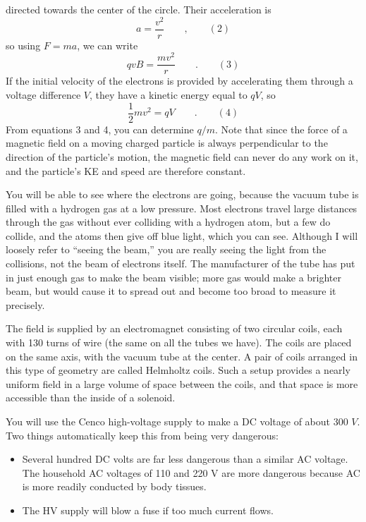 directed towards the center of the circle. Their acceleration is
\begin{equation*}
      a  =  \frac{v^2}{r}  \qquad ,  \qquad  (2)  
\end{equation*}
so using $F=ma$, we can write
\begin{equation*}
      qvB  =  \frac{mv^2}{r} \qquad .  \qquad  (3)  
\end{equation*}
If the initial velocity of the electrons is provided by
accelerating them through a voltage difference $V$, they
have a kinetic energy equal to $qV$, so
\begin{equation*}
   \frac{1}{2}mv^2 = qV \qquad . \qquad   (4)
\end{equation*}
From equations 3 and 4, you can determine $q/m$. Note that
since the force of a magnetic field on a moving charged
particle is always perpendicular to the direction of the
particle's motion, the magnetic field can never do any work
on it, and the particle's KE and speed are therefore constant.

You will be able to see where the electrons are going,
because the vacuum tube is filled with a hydrogen gas at a
low pressure. Most electrons travel large distances through
the gas without ever colliding with a hydrogen atom, but a
few do collide, and the atoms then give off blue light,
which you can see. Although I will loosely refer to ``seeing
the beam,'' you are really seeing the light from the
collisions, not the beam of electrons itself. The manufacturer
of the tube has put in just enough gas to make the beam
visible; more gas would make a brighter beam, but would
cause it to spread out and become too broad to measure it precisely.

The field is supplied by an electromagnet consisting of two
circular coils, each with 130 turns of wire (the same on all
the tubes we have). The coils are placed on the same axis,
with the vacuum tube at the center. A pair of coils arranged
in this type of geometry are called Helmholtz coils. Such a
setup provides a nearly uniform field in a large volume of
space between the coils, and that space is more accessible
than the inside of a solenoid.


You will use the Cenco high-voltage supply to make a DC
voltage of about 300 $V$. Two things automatically keep this
from being very dangerous: 

\begin{itemize}
\item[] Several hundred DC volts are far less dangerous than a
similar AC voltage. The household AC voltages of 110 and 220
V are more dangerous because AC is more readily conducted by body tissues.

\item[] The HV supply will blow a fuse if too much current flows.
\end{itemize}

